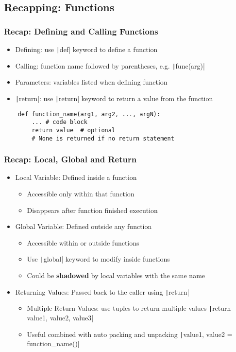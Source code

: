 \documentclass{beamer}
\newcommand{\python}[1]{\texttt|#1|}
\begin{document}
\subsection{Recapping: Functions}
\begin{frame}[fragile]
    \frametitle{Recap: Defining and Calling Functions}
    \begin{itemize}
        \item Defining: use \python{def} keyword to define a function
        \item Calling: function name followed by parentheses, e.g. \python{func(arg)}
        \item Parameters: variables listed when defining function
        \item \python{return}: use \python{return} keyword to return a value from the function
    \end{itemize}
    \begin{verbatim}
    def function_name(arg1, arg2, ..., argN):
        ... # code block
        return value  # optional
        # None is returned if no return statement
    \end{verbatim}
\end{frame}
\begin{frame}
    \frametitle{Recap: Local, Global and Return}
    \begin{itemize}
        \item Local Variable: Defined inside a function
              \begin{itemize}
                  \item Accessible only within that function
                  \item Disappears after function finished execution
              \end{itemize}
        \item Global Variable: Defined outside any function
              \begin{itemize}
                  \item Accessible within or outside functions
                  \item Use \python{global} keyword to modify inside functions
                  \item Could be \textbf{shadowed} by local variables with the same name
              \end{itemize}
        \item Returning Values: Passed back to the caller using \python{return}
              \begin{itemize}
                  \item Multiple Return Values: use tuples to return multiple values
                        \python{return value1, value2, value3}
                  \item Useful combined with auto packing and unpacking
                        \python{value1, value2 = function_name()}
              \end{itemize}
    \end{itemize}
\end{frame}
\end{document}
